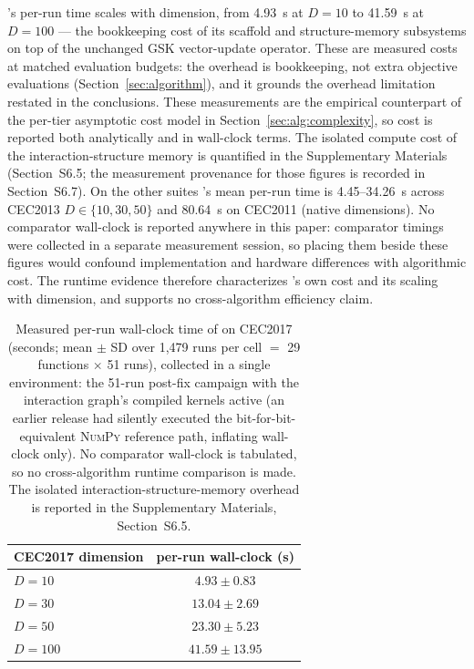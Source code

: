\dtgsk{}'s per-run time scales with dimension, from 4.93~s at $D = 10$ to
41.59~s at $D = 100$ --- the bookkeeping cost of its scaffold and
structure-memory subsystems on top of the unchanged GSK vector-update operator. These are
measured costs at matched evaluation budgets: the overhead is bookkeeping, not
extra objective evaluations (Section~\ref{sec:algorithm}), and it grounds the
overhead limitation restated in the conclusions. These measurements are the
empirical counterpart of the per-tier asymptotic cost model in
Section~\ref{sec:alg:complexity}, so cost is reported both analytically and in
wall-clock terms. The isolated compute cost of
the interaction-structure memory is quantified in the Supplementary Materials
(Section~S6.5; the measurement provenance for those figures is recorded in
Section~S6.7). On the other suites \dtgsk{}'s mean per-run time is
4.45--34.26~s across CEC2013 $D \in \{10, 30, 50\}$ and 80.64~s on CEC2011
(native dimensions). No comparator wall-clock is reported anywhere in this
paper: comparator timings were collected in a separate measurement session, so
placing them beside these figures would confound implementation and hardware
differences with algorithmic cost. The runtime evidence therefore characterizes
\dtgsk{}'s own cost and its scaling with dimension, and supports no
cross-algorithm efficiency claim.

\begin{table}[H]
\caption{Measured per-run wall-clock time of \dtgsk{} on CEC2017 (seconds; mean
$\pm$ SD over 1{,}479 runs per cell $=$ 29 functions $\times$ 51 runs), collected
in a single environment: the 51-run post-fix campaign with the interaction
graph's compiled kernels active (an earlier release had silently executed the
bit-for-bit-equivalent \textsc{NumPy} reference path, inflating wall-clock only).
No comparator wall-clock is tabulated, so no cross-algorithm runtime comparison
is made. The isolated
interaction-structure-memory overhead is reported in the Supplementary Materials,
Section~S6.5.}\label{tab:runtime}
\centering
\tablesize{\footnotesize}
\zebra
\begin{tabular}{lc}
\toprule
\textbf{CEC2017 dimension} & \textbf{\dtgsk{} per-run wall-clock (s)} \\
\midrule
$D = 10$ & $4.93 \pm 0.83$ \\
$D = 30$ & $13.04 \pm 2.69$ \\
$D = 50$ & $23.30 \pm 5.23$ \\
$D = 100$ & $41.59 \pm 13.95$ \\
\bottomrule
\end{tabular}
\end{table}


